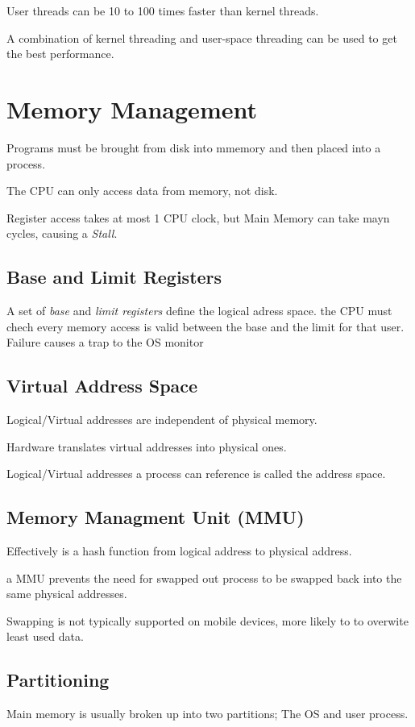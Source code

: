 \documentclass{article}
\begin{document}
User threads can be 10 to 100 times faster than kernel threads.

A combination of kernel threading and user-space threading can be used to get the best performance.


\filbreak
\section{Memory Management}
Programs must be brought from disk into mmemory and then placed into a process.

The CPU can only access data from memory, not disk.

Register access takes at most 1 CPU clock, but Main Memory can take mayn cycles, causing a \emph{Stall}.

\subsection{Base and Limit Registers}
A set of \emph{base} and \emph{limit registers} define the logical adress space. the CPU must chech every
memory access is valid between the base and the limit for that user. Failure causes a trap to the OS monitor

\subsection{Virtual Address Space}
Logical/Virtual addresses are independent of physical memory.

Hardware translates virtual addresses into physical ones.

Logical/Virtual addresses a process can reference is called the address space.

\subsection{Memory Managment Unit (MMU)}
Effectively is a hash function from logical address to physical address.

a MMU prevents the need for swapped out process to be swapped back into the same physical addresses.

Swapping is not typically supported on mobile devices, more likely to to overwite least used data.


\subsection{Partitioning}
Main memory is usually broken up into two partitions; The OS and user process.
\end{document}
